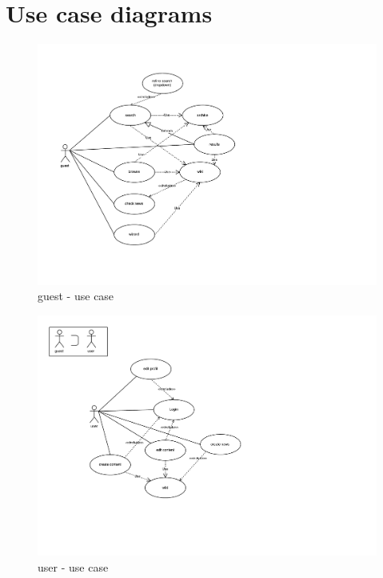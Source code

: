 \chapter{Use case diagrams}

\begin{figure}[h] 
    \centering
    \includegraphics[scale=1.0]{Pictures/Guest}
    \caption{guest - use case}
\end{figure}

\begin{figure}[h] 
    \centering
    \includegraphics[scale=1.0]{Pictures/User}
    \caption{user - use case}
\end{figure}

